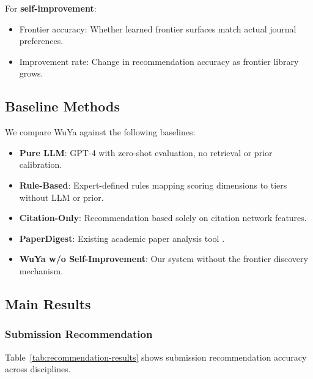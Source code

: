 \documentclass[11pt,a4paper]{article}
\begin{document}
For \textbf{self-improvement}:
\begin{itemize}
    \item Frontier accuracy: Whether learned frontier surfaces match actual journal preferences.
    \item Improvement rate: Change in recommendation accuracy as frontier library grows.
\end{itemize}

\subsection{Baseline Methods}

We compare WuYa against the following baselines:

\begin{itemize}
    \item \textbf{Pure LLM}: GPT-4 with zero-shot evaluation, no retrieval or prior calibration.
    \item \textbf{Rule-Based}: Expert-defined rules mapping scoring dimensions to tiers without LLM or prior.
    \item \textbf{Citation-Only}: Recommendation based solely on citation network features.
    \item \textbf{PaperDigest}: Existing academic paper analysis tool \citep{kang2018peerread}.
    \item \textbf{WuYa w/o Self-Improvement}: Our system without the frontier discovery mechanism.
\end{itemize}

\subsection{Main Results}

\subsubsection{Submission Recommendation}

Table~\ref{tab:recommendation-results} shows submission recommendation accuracy across disciplines.
\end{document}
